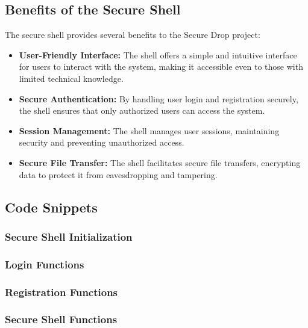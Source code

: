 \documentclass[12pt]{article}
\begin{document}
\subsection{Benefits of the Secure Shell}
The secure shell provides several benefits to the Secure Drop project:
\begin{itemize}
    \item \textbf{User-Friendly Interface:} The shell offers a simple and intuitive interface for users to interact with the system, making it accessible even to those with limited technical knowledge.
    \item \textbf{Secure Authentication:} By handling user login and registration securely, the shell ensures that only authorized users can access the system.
    \item \textbf{Session Management:} The shell manages user sessions, maintaining security and preventing unauthorized access.
    \item \textbf{Secure File Transfer:} The shell facilitates secure file transfers, encrypting data to protect it from eavesdropping and tampering.
\end{itemize}

\subsection{Code Snippets}
\subsubsection{Secure Shell Initialization}


\subsubsection{Login Functions}


\subsubsection{Registration Functions}


\subsubsection{Secure Shell Functions}

\end{document}
